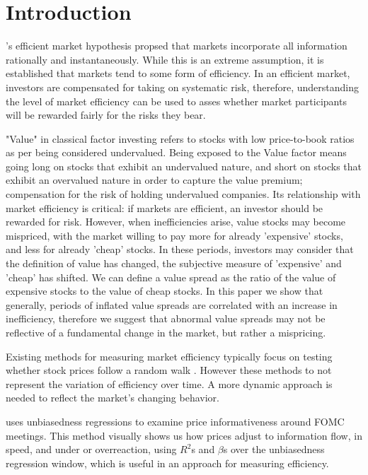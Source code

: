 \section{Introduction}
\indent \citet{fama_random_walk}'s efficient market hypothesis propsed that markets incorporate all information rationally and instantaneously. While 
this is an extreme assumption, it is established that markets tend to some form of efficiency. In an efficient market, investors are compensated for taking on systematic risk, therefore, understanding the level of 
market efficiency can be used to asses whether market participants will be rewarded fairly for the risks they bear.

"Value" in classical factor investing refers to stocks with low price-to-book ratios as per \citet{fama_french_1993} being considered undervalued. Being exposed to the Value factor means
going long on stocks that exhibit an undervalued nature, and short on stocks that exhibit an overvalued nature in order to capture the value premium; compensation for the risk of holding undervalued companies. 
Its relationship with market efficiency is critical: if markets are efficient, an investor should be rewarded for risk. 
However, when inefficiencies arise, value stocks may become mispriced, with the market willing to pay more for already 'expensive' stocks, and
less for already 'cheap' stocks. In these periods, investors may consider that the definition of value has changed, the subjective measure of 
'expensive' and 'cheap' has shifted. We can define a value spread as the ratio of the value of expensive stocks to the value of cheap stocks.
In this paper we show that generally, periods of inflated value spreads are correlated with an increase in inefficiency,
therefore we suggest that abnormal value spreads may not be reflective of a fundamental change in the market, but rather a mispricing.

Existing methods for measuring market efficiency typically focus on testing whether stock prices follow a random walk
\citep{fama_random_walk} \citep{lim_brooks_2010}. However these methods to not represent the variation of efficiency over time.
A more dynamic approach is needed to reflect the market’s changing behavior.

\citet{boguth_2023} uses unbiasedness regressions to examine price informativeness around FOMC meetings. 
This method visually shows us how prices adjust to information flow, in speed, and under or overreaction, using $R^2$s and $\beta$s over the unbiasedness regression window,
which is useful in an approach for measuring efficiency.

